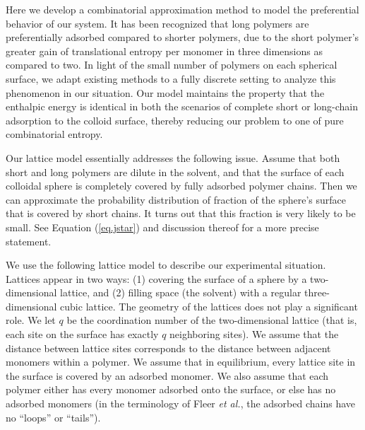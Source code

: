 \documentclass[journal=mamobx,manuscript=article]{achemso}
\begin{document}
Here we develop a combinatorial approximation method %
to model the preferential behavior of our system.
It has been recognized that long polymers are
preferentially adsorbed compared to shorter polymers,
due to the short polymer's greater gain of
translational entropy per monomer in three dimensions
as compared to two.\cite{Fleer1993} 
In light of the small number of polymers on each
spherical surface, we adapt existing methods to a
fully discrete setting to analyze this phenomenon in our
situation.  Our model maintains the property that the enthalpic energy is identical in both the scenarios of complete short or long-chain adsorption to the colloid surface, thereby reducing our problem
to one of pure 
combinatorial entropy. 

Our lattice model essentially addresses
the following issue.
Assume that both short and long polymers 
are dilute in the solvent, and that the 
surface of each colloidal sphere is completely covered 
by fully adsorbed polymer chains.  Then we 
can approximate the probability distribution of  fraction of the sphere's surface that is 
covered by short chains.  It turns out that this 
fraction is very likely to be small.
See  Equation (\ref{eq.jstar}) and discussion thereof for a more precise statement. 


We use the following lattice model to describe our experimental situation.  
Lattices appear in two ways:  (1) covering the surface of a sphere by a two-dimensional lattice, and
(2) filling space (the solvent) with a regular three-dimensional cubic lattice.  
The geometry of the lattices does not play a significant role.  
We let $q$ be the coordination number of the two-dimensional lattice 
(that is, each site on the surface has exactly $q$ neighboring sites).  We assume that 
the distance between lattice sites corresponds to the distance between adjacent monomers within a polymer.  
We assume that in equilibrium, every lattice site in the surface is covered by an adsorbed monomer.
We also assume that each polymer either has every monomer adsorbed onto the surface, or else has no adsorbed monomers (in the terminology of Fleer \textit{et al.}\cite{Fleer1993}, the adsorbed chains
have no ``loops'' or ``tails'').
\end{document}
